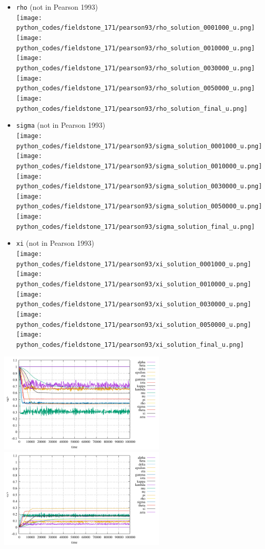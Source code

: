 \begin{itemize}
\item {\tt rho} (not in Pearson 1993)\\
\texttt{[image: python\_codes/fieldstone\_171/pearson93/rho\_solution\_0001000\_u.png]}
\texttt{[image: python\_codes/fieldstone\_171/pearson93/rho\_solution\_0010000\_u.png]}
\texttt{[image: python\_codes/fieldstone\_171/pearson93/rho\_solution\_0030000\_u.png]}
\texttt{[image: python\_codes/fieldstone\_171/pearson93/rho\_solution\_0050000\_u.png]}
\texttt{[image: python\_codes/fieldstone\_171/pearson93/rho\_solution\_final\_u.png]}

\item {\tt sigma} (not in Pearson 1993)\\
\texttt{[image: python\_codes/fieldstone\_171/pearson93/sigma\_solution\_0001000\_u.png]}
\texttt{[image: python\_codes/fieldstone\_171/pearson93/sigma\_solution\_0010000\_u.png]}
\texttt{[image: python\_codes/fieldstone\_171/pearson93/sigma\_solution\_0030000\_u.png]}
\texttt{[image: python\_codes/fieldstone\_171/pearson93/sigma\_solution\_0050000\_u.png]}
\texttt{[image: python\_codes/fieldstone\_171/pearson93/sigma\_solution\_final\_u.png]}

\item {\tt xi} (not in Pearson 1993)\\
\texttt{[image: python\_codes/fieldstone\_171/pearson93/xi\_solution\_0001000\_u.png]}
\texttt{[image: python\_codes/fieldstone\_171/pearson93/xi\_solution\_0010000\_u.png]}
\texttt{[image: python\_codes/fieldstone\_171/pearson93/xi\_solution\_0030000\_u.png]}
\texttt{[image: python\_codes/fieldstone\_171/pearson93/xi\_solution\_0050000\_u.png]}
\texttt{[image: python\_codes/fieldstone\_171/pearson93/xi\_solution\_final\_u.png]}

\end{itemize}


\includegraphics[width=8cm]{python_codes/fieldstone_171/pearson93/stats_u.pdf}
\includegraphics[width=8cm]{python_codes/fieldstone_171/pearson93/stats_v.pdf}


